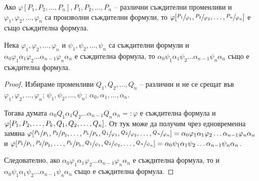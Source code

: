 \documentclass{article}
\def\Proofs{1}
\begin{document}
\begin{claim}
Ако $\varphi[P_1, P_2, \ldots, P_n], P_1, P_2, \ldots, P_n$ -- различни съждителни променливи и $\varphi_1, \varphi_2, \ldots, \varphi_n$ са произволни съждителни формули, то $\varphi[\sfrac{P_1}{\varphi_1}, \sfrac{P_2}{\varphi_2}, \ldots, \sfrac{P_n}{\varphi_n}]$ е също съждителна формула.
\end{claim}

\begin{claim}
Нека $\varphi_1, \varphi_2, \ldots, \varphi_n$ и $\psi_1, \psi_2, \ldots, \psi_n$ са съждителни формули и $\alpha_0\varphi_1\alpha_1\varphi_2\ldots\alpha_{n-1}\varphi_n\alpha_n$ е съждителна формула, то $\alpha_0\psi_1\alpha_1\psi_2\ldots\alpha_{n-1}\psi_n\alpha_n$ също е съждителна формула.


\ifcase\Proofs\or
\begin{proof}
Избираме променливи $Q_1, Q_2, \ldots, Q_n$ -- различни и не се срещат във $\varphi_1, \varphi_2, \ldots, \varphi_n$; $\psi_1, \psi_2, \ldots, \psi_n$; $\alpha_0, \alpha_1, \ldots, \alpha_n$.

Тогава думата $\alpha_0Q_1\alpha_1Q_2\ldots\alpha_{n-1}Q_n\alpha_n =: \varphi$ е съждителна формула и $\\ \varphi[P_1, P_2, \ldots, P_k, Q_1, Q_2, \ldots, Q_n]$. От тук може да получим чрез едновременна замяна $\\ \varphi[\sfrac{P_1}{P_1}, \sfrac{P_2}{P_2}, \ldots, \sfrac{P_k}{P_k}, \sfrac{Q_1}{\varphi_1}, \sfrac{Q_2}{\varphi_2}, \ldots, \sfrac{Q_n}{\varphi_n}] = \alpha_0\varphi_1\alpha_1\varphi_2\ldots\alpha_{n-1}\varphi_n\alpha_n$ и $\\ \varphi[\sfrac{P_1}{P_1}, \sfrac{P_2}{P_2}, \ldots, \sfrac{P_k}{P_k}, \sfrac{Q_1}{\psi_1}, \sfrac{Q_2}{\psi_2}, \ldots, \sfrac{Q_n}{\psi_n}] = \alpha_0\psi_1\alpha_1\psi_2\ldots\alpha_{n-1}\psi_n\alpha_n$.

Следователно, ако $\alpha_0\varphi_1\alpha_1\varphi_2\ldots\alpha_{n-1}\varphi_n\alpha_n$ е съждителна формула, то и $\alpha_0\psi_1\alpha_1\psi_2\ldots\alpha_{n-1}\psi_n\alpha_n$ също е съждителна формула.
\end{proof}
\fi
\end{claim}
\end{document}

